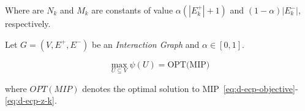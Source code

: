
Where are $N_k$ and $M_k$ are constants of value $\alpha (|E_k^{+}| + 1)$ and $(1 -
	\alpha ) |E^{-}_k|$, respectively.

\begin{theorem}
	\label{th:d-ecp-mip}
	Let $G = (V, E^{+}, E^{-})$ be an \emph{Interaction Graph} and $\alpha \in
		[0, 1]$.

	\begin{equation}
		\max_{U \subseteq V} \psi(U) = \text{OPT(MIP)}
	\end{equation}

	where $OPT(MIP)$ denotes the optimal solution to
	MIP~\ref{eq:d-ecp-objective}-\ref{eq:d-ecp-z-k}.
\end{theorem}

